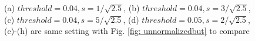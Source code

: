 \documentclass[final]{cvpr}
\begin{document}
\begin{appendices}
\begin{figure}[htbp]
{    }
    \quad
    \quad
    \caption{(a) $threshold=0.04, s=1/\sqrt{2.5}$, (b) $threshold=0.04, s=3/\sqrt{2.5}$, (c) $threshold=0.04, s=5/\sqrt{2.5}$, (d) $threshold=0.05, s=2/\sqrt{2.5}$, (e)-(h) are same setting with Fig. \ref{fig: unnormalizedbut} to compare}
    \label{fig: normalizedsun}
    \end{figure}

\end{appendices}
\end{document}

